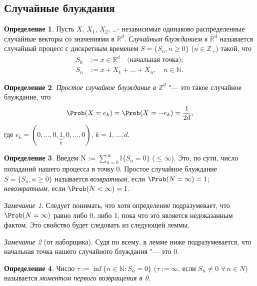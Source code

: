 \documentclass[a4paper]{article}
\theoremstyle{plain}
\theoremstyle{definition}
\newtheorem{defn}{Определение}[section]
\theoremstyle{remark}
\newtheorem*{rem}{Замечание}
\begin{document}
\subsection{Случайные блуждания}

\begin{defn}
  Пусть $X$, $X_{1}$, $X_{2}$, \ldots - независимые одинаково распределенные случайные векторы со значениями в $\mathbb{R}^{d}$. \emph{Случайным блужданием в $\mathbb{R}^{d}$} называется случайный процесс с дискретным временем $S = \lbrace S_{n}, n \geqslant 0 \rbrace$ ($n \in \mathbb{Z}_{+}$) такой, что
  \begin{align*}
    S_{0} &:= x \in \mathbb{R}^{d} \quad\text{(начальная точка)};\\
    S_{n} &:= x + X_{1} + \ldots + X_{n}, \quad n \in \mathbb{N}.
  \end{align*}
\end{defn}

\begin{defn}
  \emph{Простое случайное блуждание в $\mathbb{Z}^{d}$} "--- это такое случайное блуждание, что
  \begin{equation*}
    \Prob(X = e_{k}) = \Prob(X = -e_{k}) = \frac{1}{2d},
  \end{equation*}
  где $e_{k} = (0, \ldots, 0, \underbrace{1}_{k}, 0, \ldots, 0)$, $k = 1, \ldots, d$.
\end{defn}

\begin{defn}
  Введем N := $\sum\limits_{n=0}^\infty \mathbb{I} \lbrace S_{n} = 0 \rbrace$ ($\leqslant \infty$). Это, по сути, число попаданий нашего процесса в точку 0. Простое случайное блуждание $S = \lbrace S_{n}, n \geqslant 0\rbrace$ называется \emph{возвратным}, если $\Prob(N = \infty) = 1$; \emph{невозвратным}, если $\Prob(N < \infty) = 1$.
\end{defn}

\begin{rem}
  Следует понимать, что хотя определение подразумевает, что $\Prob(N = \infty)$ равно либо 0, либо 1, пока что это является недоказанным фактом. Это свойство будет следовать из следующей леммы.
\end{rem}

\begin{rem}[от наборщика]
  Судя по всему, в лемме ниже подразумевается, что начальная точка нашего случайного блуждания "--- это 0.
\end{rem}
\begin{defn}
  Число $\tau := \inf\lbrace n \in \mathbb{N} : S_{n} = 0 \rbrace$ ($\tau := \infty$, если $S_{n} \neq 0$ $\forall\, n \in N$) называется \emph{моментом первого возвращения в 0}.
\end{defn}
\end{document}
